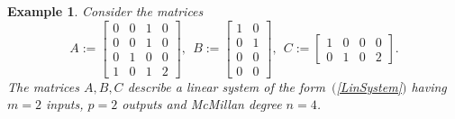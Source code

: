 \documentclass[12pt]{report}
\newtheorem{example}[thm]{Example}
\newenvironment{ex}{\begin{example}\rm}{\end{example}}
\numberwithin{equation}{chapter}
\numberwithin{figure}{chapter}
\newcommand{\eqr}[1]{~\mbox{$(${\rm \ref{#1}}$)$}}
\begin{document}
\begin{ex}
Consider the matrices
  $$
  A := \left[ {\begin{array}{rrrr}
        0 & 0 & 1 & 0 \\
        0 & 0 & 1 & 0 \\
        0 & 1 & 0 & 0 \\
        1 & 0 & 1 & 2
\end{array}}
\right],\ \ B := \left[ {\begin{array}{rr}
      1 & 0 \\
      0 & 1 \\
      0 & 0 \\
      0 & 0
\end{array}}
\right], \ \ C := \left[ {\begin{array}{rrrr}
      1 & 0 & 0 & 0 \\
      0 & 1 & 0 & 2
\end{array}}
\right].
$$
The matrices $A,B,C$ describe a linear system of the
form\eqr{LinSystem} having $m=2$ inputs, $p=2$ outputs and
McMillan degree $n=4$.


\end{ex}
\end{document}
